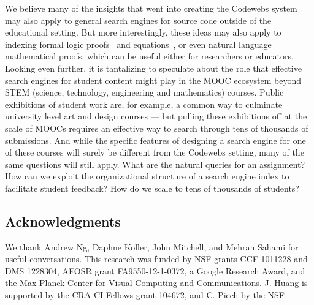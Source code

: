 We believe  many of the insights that went into creating the Codewebs system
may also apply to general search engines for source code outside of the educational setting. 
But more interestingly, these ideas may also apply to indexing formal logic proofs~\cite{fast13} and equations~\cite{kohlhase06}, or even 
natural language mathematical proofs, which can be useful either for researchers or educators.
Looking even further, it is tantalizing to speculate about the role that effective search engines for student content
 might play in the MOOC ecosystem beyond STEM (science, technology, engineering and mathematics) courses. 
Public exhibitions of student work are, for example, a common way to culminate university level art and design courses --- but 
pulling these exhibitions off at the scale of MOOCs requires an effective way to search through tens of thousands of submissions.
And while the specific features of designing a search engine for one of these courses will surely be different from the Codewebs
setting,  many of the same questions will still apply.  
What are the natural queries for an assignment?
How can we exploit the organizational structure of a search engine index to facilitate student feedback?
How do we scale to tens of thousands of students?

\subsection*{Acknowledgments}

We thank Andrew Ng, Daphne Koller, John Mitchell, and Mehran Sahami for 
useful conversations.
This research was funded by
NSF grants CCF 1011228 and  DMS 1228304, AFOSR grant FA9550-12-1-0372,  a Google Research Award, and the Max Planck Center for Visual Computing and Communications.
J. Huang is supported by the CRA CI Fellows grant 104672, and C. Piech by the NSF